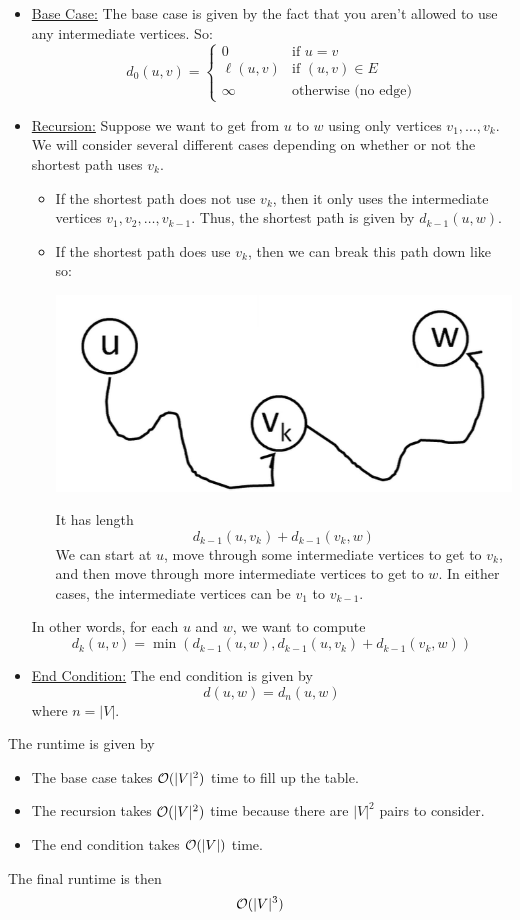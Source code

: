 \documentclass[letterpaper]{article}
\begin{document}
\begin{itemize}
    \item \underline{Base Case:} The base case is given by the fact that you aren't allowed to use any intermediate vertices. So: 
    \[d_{0}(u, v) = \begin{cases}
        0 & \text{if } u = v \\ 
        \ell(u, v) & \text{if } (u, v) \in E \\ 
        \infty & \text{otherwise (no edge)} 
    \end{cases}\]

    \item \underline{Recursion:} Suppose we want to get from $u$ to $w$ using only vertices $v_1, \dots, v_k$. We will consider several different cases depending on whether or not the shortest path uses $v_k$.
    \begin{itemize}
        \item If the shortest path does not use $v_k$, then it only uses the intermediate vertices $v_1, v_2, \dots, v_{k - 1}$. Thus, the shortest path is given by $d_{k - 1}(u, w)$. 
        \item If the shortest path does use $v_k$, then we can break this path down like so: 
        \begin{center}
            \includegraphics[scale=0.5]{../assets/sp3.png}
        \end{center}
        It has length 
        \[d_{k - 1}(u, v_k) + d_{k - 1}(v_k, w)\]
        We can start at $u$, move through some intermediate vertices to get to $v_k$, and then move through more intermediate vertices to get to $w$. In either cases, the intermediate vertices can be $v_1$ to $v_{k - 1}$. 
    \end{itemize}
    In other words, for each $u$ and $w$, we want to compute 
    \[d_{k}(u, v) = \min(d_{k - 1}(u, w), d_{k - 1}(u, v_k) + d_{k - 1}(v_k, w))\]

    \item \underline{End Condition:} The end condition is given by 
    \[d(u, w) = d_{n}(u, w)\]
    where $n = |V|$. 
\end{itemize}
The runtime is given by 
\begin{itemize}
    \item The base case takes $\mathcal{O}(|V|^2)$ time to fill up the table. 
    \item The recursion takes $\mathcal{O}(|V|^2)$ time because there are $|V|^2$ pairs to consider.
    \item The end condition takes $\mathcal{O}(|V|)$ time. 
\end{itemize}
The final runtime is then 
\[\mathcal{O}(|V|^3)\]
\end{document}
